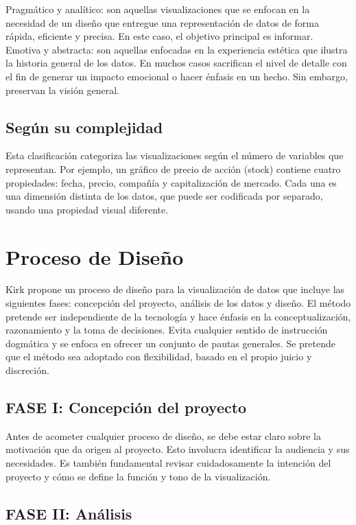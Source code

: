 Pragmático y analítico: son aquellas visualizaciones que se enfocan en la necesidad de un diseño que entregue una representación de datos de forma rápida, eficiente y precisa. En este caso, el objetivo principal es informar.
Emotiva y abstracta: son aquellas enfocadas en la experiencia estética que ilustra la historia general de los datos. En muchos casos sacrifican el nivel de detalle con el fin de generar un impacto emocional o hacer énfasis en un hecho. Sin embargo, preservan la visión general.

\subsection{Según su complejidad}

Esta clasificación categoriza las visualizaciones según el número de variables que representan. Por ejemplo, un gráfico de precio de acción (stock) contiene cuatro propiedades: fecha, precio, compañía y capitalización de mercado. Cada una es una dimensión distinta de los datos, que puede ser codificada por separado, usando una propiedad visual diferente.

\section{Proceso de Diseño}

Kirk \cite{Kir12} propone un proceso de diseño para la visualización de datos que incluye las siguientes fases: concepción del proyecto, análisis de los datos y diseño. El método pretende ser independiente de la tecnología y hace énfasis en la conceptualización, razonamiento y la toma de decisiones. Evita cualquier sentido de instrucción dogmática y se enfoca en ofrecer un conjunto de pautas generales. Se pretende que el método sea adoptado con flexibilidad, basado en el propio juicio y discreción.

\subsection{FASE I: Concepción del proyecto}

Antes de acometer cualquier proceso de diseño, se debe estar claro sobre la motivación que da origen al proyecto. Esto involucra identificar la audiencia y sus necesidades. Es también fundamental revisar cuidadosamente la intención del proyecto y cómo se define la función y tono de la visualización.

\subsection{FASE II: Análisis}

